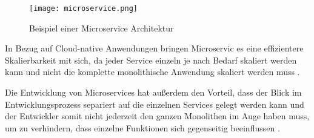 \begin{figure}[H]
    \centering
    \texttt{[image: microservice.png]}
    \caption{Beispiel einer Microservice Architektur \cite[Nachbildung angelehnt an][S. 150]{Gos2020}}
    \label{fig:microservice}
\end{figure}

In Bezug auf Cloud-native Anwendungen bringen Microservic es eine effizientere Skalierbarkeit mit sich, da jeder Service einzeln je nach Bedarf skaliert werden kann und nicht die komplette monolithische Anwendung skaliert werden muss \cite[Vgl.][]{Janssen2021}.

Die Entwicklung von Microservices hat außerdem den Vorteil, dass der Blick im Entwicklungsprozess separiert auf die einzelnen Services gelegt werden kann und der Entwickler somit nicht jederzeit den ganzen Monolithen im Auge haben muss, um zu verhindern, dass einzelne Funktionen sich gegenseitig beeinflussen \cite[Vgl.][]{Janssen2021}.

